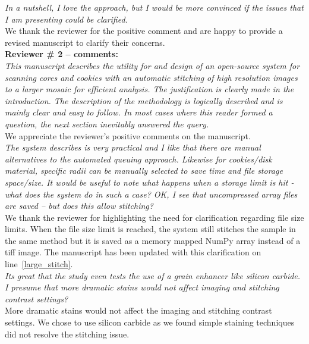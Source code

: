 \documentclass[12pt,a4paper]{article}
\newcommand{\lr}[1]{line~\ref{#1}}
\begin{document}
\emph{In a nutshell, I love the approach, but I would be more convinced if the issues that I am presenting could be clarified.} \\

We thank the reviewer for the positive comment and are happy to provide a revised manuscript to clarify their concerns. \\

{\bf Reviewer \# 2 -- comments:} \\

\emph{This manuscript describes the utility for and design of an open-source system for scanning cores and cookies with an automatic stitching of high resolution images to a larger mosaic for efficient analysis. The justification is clearly made in the introduction. The description of the methodology is logically described and is mainly clear and easy to follow. In most cases where this reader formed a question, the next section inevitably answered the query.} \\

We appreciate the reviewer's positive comments on the manuscript. \\

\emph{The system describes is very practical and I like that there are manual alternatives to the automated queuing approach. Likewise for cookies/disk material, specific radii can be manually selected to save time and file storage space/size. It would be useful to note what happens when a storage limit is hit -what does the system do in such a case? OK, I see that uncompressed array files are saved – but does this allow stitching?}\\

We thank the reviewer for highlighting the need for clarification regarding file size limits. When the file size limit is reached, the system still stitches the sample in the same method but it is saved as a memory mapped NumPy array instead of a tiff image. The manuscript has been updated with this clarification on \lr{large_stitch}.\\

\emph{Its great that the study even tests the use of a grain enhancer like silicon carbide. I presume that more dramatic stains would not affect imaging and stitching contrast settings?}\\

More dramatic stains would not affect the imaging and stitching contrast settings. We chose to use silicon carbide as we found simple staining techniques did not resolve the stitching issue.\\ %
\end{document}

